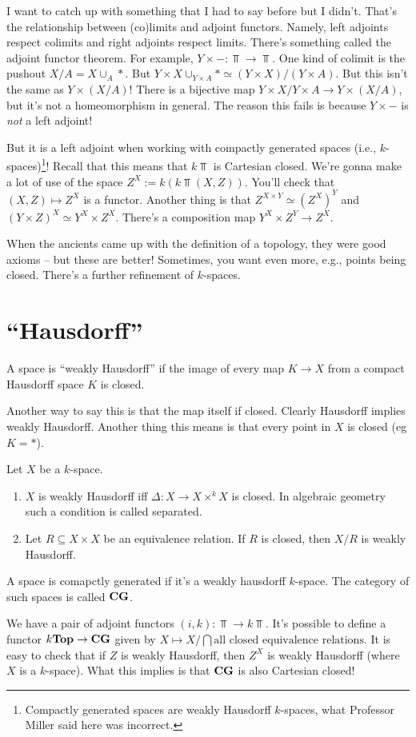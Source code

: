 I want to catch up with something that I had to say before but I didn't. That's the relationship between (co)limits and adjoint functors. Namely, left adjoints respect colimits and right adjoints respect limits. There's something called the adjoint functor theorem. For example, $Y\times -:\Top\to\Top$. One kind of colimit is the pushout $X/A=X\cup_A \ast$. But $Y\times X\cup_{Y\times A}\ast\simeq (Y\times X)/(Y\times A)$. But this isn't the same as $Y\times (X/A)$! There is a bijective map $Y\times X/Y\times A\to Y\times(X/A)$, but it's not a homeomorphism in general. The reason this fails is because $Y\times -$ is \emph{not} a left adjoint!

But it is a left adjoint when working with compactly generated spaces (i.e., $k$-spaces)\footnote{Compactly generated spaces are weakly Hausdorff $k$-spaces, what Professor Miller said here was incorrect.}! Recall that this means that $k\Top$ is Cartesian closed. We're gonna make a lot of use of the space $Z^X:=k(k\Top(X,Z))$. You'll check that $(X,Z)\mapsto Z^X$ is a functor. Another thing is that $Z^{X\times Y}\simeq (Z^X)^Y$ and $(Y\times Z)^X\simeq Y^X\times Z^X$. There's a composition map $Y^X\times Z^Y\to Z^X$.

When the ancients came up with the definition of a topology, they were good axioms -- but these are better! Sometimes, you want even more, e.g., points being closed. There's a further refinement of $k$-spaces. 
\section{``Hausdorff''}
\begin{definition}
    A space is ``weakly Hausdorff'' if the image of every map $K\to X$ from a compact Hausdorff space $K$ is closed.
\end{definition}
Another way to say this is that the map itself if closed. Clearly Hausdorff implies weakly Hausdorff. Another thing this means is that every point in $X$ is closed (eg $K=\ast$). 
\begin{prop}
    Let $X$ be a $k$-space.
    \begin{enumerate}
	\item $X$ is weakly Hausdorff iff $\Delta:X\to X\times^k X$ is closed. In algebraic geometry such a condition is called separated.
	\item Let $R\subseteq X\times X$ be an equivalence relation. If $R$ is closed, then $X/R$ is weakly Hausdorff.
    \end{enumerate}
\end{prop}
\begin{definition}
    A space is comapctly generated if it's a weakly hausdorff $k$-space. The category of such spaces is called $\mathbf{CG}$.
\end{definition}
We have a pair of adjoint functors $(i,k):\Top\to k\Top$. It's possible to define a functor $k\mathbf{Top}\to \mathbf{CG}$ given by $X\mapsto X/\bigcap\text{all closed equivalence relations}$. It is easy to check that if $Z$ is weakly Hausdorff, then $Z^X$ is weakly Hausdorff (where $X$ is a $k$-space). What this implies is that $\mathbf{CG}$ is also Cartesian closed!

